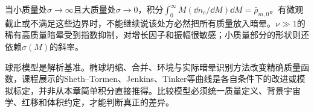 当小质量处$\sigma\to\infty$且大质量处$\sigma\to0$，积分$\int_0^\infty M(\dd n_c/\dd M)\dd M=\bar\rho_{m,0}$。有微观截止或不满足这些边界时，不能继续说该处方必然把所有质量放入暗晕。$\nu\gg1$的稀有高质量暗晕受到指数抑制，对增长因子和振幅很敏感；小质量部分的形状则还依赖$\sigma(M)$的斜率。

球形模型是解析基准。椭球坍缩、合并、环境与实际暗晕识别方法改变精确质量函数，课程展示的Sheth--Tormen、Jenkins、Tinker等曲线是各自条件下的改进或模拟标定，并非从本章简单积分直接推得。比较模型必须统一质量定义、背景宇宙学、红移和体积约定，才能判断真正的差异。
